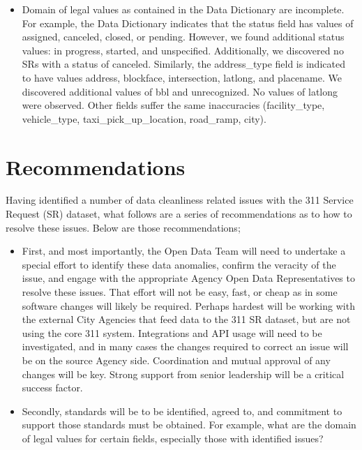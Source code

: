 \documentclass[12pt, titlepage]{article}
\begin{document}
{\begin{itemize}
	\item Domain of legal values as contained in the Data Dictionary 
	are incomplete. For example, the Data Dictionary indicates that 
	the status field has values of assigned, canceled, closed, or pending. 
	However, we found additional status values: in progress, started, 
	and unspecified. Additionally, we discovered no SRs with a status of 
	canceled. Similarly, the address\_type field is indicated to have 
	values address, blockface, intersection, latlong, and placename. We 
	discovered additional values of bbl and unrecognized. No values of 
	latlong were observed. Other fields suffer the same 	inaccuracies 
	(facility\_type, vehicle\_type, taxi\_pick\_up\_location, road\_ramp, city).
\end{itemize}



\section{Recommendations} \label{sec:recommendations}
Having identified a number of data cleanliness related issues with the 
311 Service Request (SR) dataset, what follows are a series of 
recommendations as to how to resolve these issues. Below are 
those recommendations;

\begin{itemize}
	\item First, and most importantly, the Open Data Team will need 
	to undertake a special effort to identify these data anomalies, confirm 
	the veracity of the issue, and engage with the appropriate Agency 
	Open Data Representatives to resolve these issues. That effort will 
	not be easy, fast, or cheap as in some software changes will likely 
	be required. Perhaps hardest will be working with the external City 
	Agencies that feed data to the 311 SR dataset, but are not using 
	the core 311 system. Integrations and API usage will need to be 
	investigated, and in many cases the changes required to correct 
	an issue will be on the source Agency side. Coordination and 
	mutual approval of any changes will be key. Strong support from 
	senior 	leadership will be a critical success factor.

	\item Secondly, standards will be to be identified, agreed to, and 
	commitment to support those standards must be obtained. For 
	example, what are the domain of legal values for certain fields, 
	especially those with identified issues?


\end{itemize}}
\end{document}
